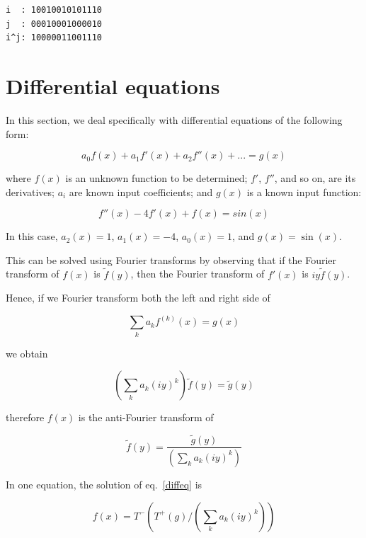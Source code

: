 \documentclass[justified, sixbynine]{tufte-book}
\theoremstyle{plain}%
\newtheorem * {corollary}{Corollary}
\theoremstyle{definition}
\theoremstyle{remark}
\newtheorem * {remark}{Remark}
\newtheorem * {note}{Note}
\begin{document}
\begin{fullwidth}
\begin{lstlisting}
i  : 10010010101110
j  : 00010001000010
i^j: 10000011001110
\end{lstlisting}

\section{Differential equations}

In this section, we deal specifically with differential equations of the following form:

\begin{equation}
a_0 f(x) + a_1 f'(x) + a_2 f''(x) + ... = g(x) \label{diffeq}
\end{equation}

where $f(x)$ is an unknown function to be determined; $f'$, $f''$, and so on, are its derivatives; $a_i$ are known input coefficients; and $g(x)$ is a known input function:

\begin{equation}
f''(x) - 4 f'(x) + f(x) = sin(x)
\end{equation}

In this case, $a_2(x) = 1$, $a_1(x) = -4$, $a_0(x) = 1$, and $g(x) = \sin(x)$.

This can be solved using Fourier transforms by observing that if the Fourier transform of $f(x)$ is $\tilde f(y)$, then the Fourier transform of $f'(x)$ is $iy\tilde f(y)$.

Hence, if we Fourier transform both the left and right side of

\begin{equation}
\sum _k a_k f^{(k)}(x) = g(x)
\end{equation}

we obtain

\begin{equation}
(\sum _k a_k (i y)^k) \tilde f(y) = \tilde g(y)
\end{equation}

therefore $f(x)$ is the anti-Fourier transform of

\begin{equation}
\tilde f(y) = \frac{\tilde g(y)}{(\sum _k a_k (i y)^k)}
\end{equation}

In one equation, the solution of eq.~\ref{diffeq} is

\begin{equation}
f(x) = T^-(T^+(g)/(\sum _k a_k (iy)^k))
\end{equation}


\end{fullwidth}
\end{document}
